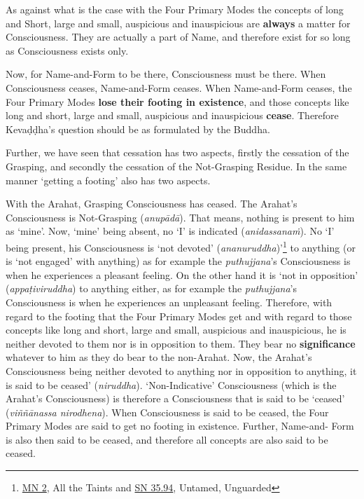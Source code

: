 As against what is the case with the Four Primary Modes the concepts of long and Short, large and small, auspicious and inauspicious are \textbf{always} a matter for Consciousness. They are actually a part of Name, and therefore exist for so long as Consciousness exists only.

Now, for Name-and-Form to be there, Consciousness must be there. When Consciousness ceases, Name-and-Form ceases. When Name-and-Form ceases, the Four Primary Modes \textbf{lose their footing in existence}, and those concepts like long and short, large and small, auspicious and inauspicious \textbf{cease}. Therefore Kevaḍḍha's question should be as formulated by the Buddha.

Further, we have seen that cessation has two aspects, firstly the cessation of the Grasping, and secondly the cessation of the Not-Grasping Residue. In the same manner `getting a footing' also has two aspects.

With the Arahat, Grasping Consciousness has ceased. The Arahat's Consciousness is Not-Grasping (\emph{anupādā}). That means, nothing is present to him as `mine'. Now, `mine' being absent, no `I' is indicated (\emph{anidassanaṁ}). No `I' being present, his Consciousness is `not devoted' (\emph{ananuruddha})'\footnote{\href{https://suttacentral.net/mn2/en/bodhi}{MN 2}, All the Taints and \href{https://suttacentral.net/sn35.94/en/bodhi}{SN 35.94}, Untamed, Unguarded} to anything (or is `not engaged' with anything) as for example the \emph{puthujjana}'s Consciousness is when he experiences a pleasant feeling. On the other hand it is `not in opposition' (\emph{appaṭiviruddha}) to anything either, as for example the \emph{puthujjana}'s Consciousness is when he experiences an unpleasant feeling. Therefore, with regard to the footing that the Four Primary Modes get and with regard to those concepts like long and short, large and small, auspicious and inauspicious, he is neither devoted to them nor is in opposition to them. They bear no \textbf{significance} whatever to him as they do bear to the non-Arahat. Now, the Arahat's Consciousness being neither devoted to anything nor in opposition to anything, it is said to be ceased' (\emph{niruddha}). `Non-Indicative' Consciousness (which is the Arahat's Consciousness) is therefore a Consciousness that is said to be `ceased' (\emph{viññānassa nirodhena}). When Consciousness is said to be ceased, the Four Primary Modes are said to get no footing in existence. Further, Name-and- Form is also then said to be ceased, and therefore all concepts are also said to be ceased.

